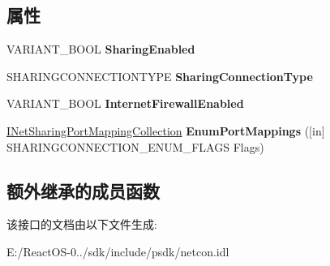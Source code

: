 \subsection*{属性}
\begin{DoxyCompactItemize}
\item 
\mbox{\label{interface_i_net_sharing_configuration_a6a6954a13f00b90e0330f5ba4011ca1e}} 
V\+A\+R\+I\+A\+N\+T\+\_\+\+B\+O\+OL {\bfseries Sharing\+Enabled}
\item 
\mbox{\label{interface_i_net_sharing_configuration_a27e580da4cdbe738629a2033bb0f1017}} 
S\+H\+A\+R\+I\+N\+G\+C\+O\+N\+N\+E\+C\+T\+I\+O\+N\+T\+Y\+PE {\bfseries Sharing\+Connection\+Type}
\item 
\mbox{\label{interface_i_net_sharing_configuration_ad45d99a03d8cd27c7c5e29f8458549ba}} 
V\+A\+R\+I\+A\+N\+T\+\_\+\+B\+O\+OL {\bfseries Internet\+Firewall\+Enabled}
\item 
\mbox{\label{interface_i_net_sharing_configuration_a3144e140a93e72259953649171dd45ce}} 
\hyperlink{interface_i_net_sharing_port_mapping_collection}{I\+Net\+Sharing\+Port\+Mapping\+Collection} {\bfseries Enum\+Port\+Mappings} (\mbox{[}in\mbox{]} S\+H\+A\+R\+I\+N\+G\+C\+O\+N\+N\+E\+C\+T\+I\+O\+N\+\_\+\+E\+N\+U\+M\+\_\+\+F\+L\+A\+GS Flags)
\end{DoxyCompactItemize}
\subsection*{额外继承的成员函数}


该接口的文档由以下文件生成\+:\begin{DoxyCompactItemize}
\item 
E\+:/\+React\+O\+S-\/0../sdk/include/psdk/netcon.\+idl\end{DoxyCompactItemize}
